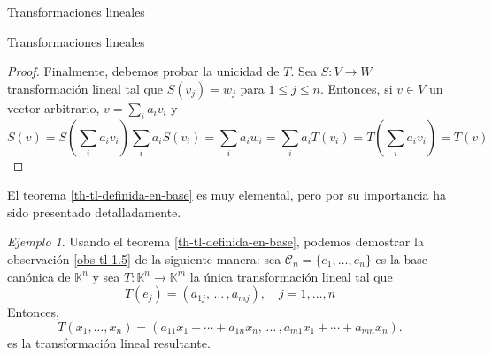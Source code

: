 \documentclass[a4paper,12pt,twoside,spanish,reqno]{amsbook}
\numberwithin{equation}{section}
\theoremstyle{definition}
\theoremstyle{remark}
\newtheorem*{ejemplo*}{Ejemplo}
\newcommand{\K}{\mathbb K}
\begin{document}
\begin{chapter}{Transformaciones lineales}
\begin{section}{Transformaciones lineales}
\begin{proof}
                Finalmente,  debemos probar la unicidad de $T$. Sea $S: V \to W$ transformación lineal tal que $S(v_j) = w_j$ para $1 \le j \le n$. Entonces,  si $v \in V$ un vector arbitrario, $v = \sum_i a_i v_i$ y
                \begin{equation*}
                    S(v) = S(\sum_i a_i v_i)\sum_i a_i S( v_i) = \sum_i a_iw_i = 
                     \sum_i a_i T( v_i) =  T(\sum_i a_i v_i) = T(v)
                \end{equation*}
            \end{proof}
        
        El teorema \ref{th-tl-definida-en-base} es muy elemental, pero por su importancia ha sido presentado
        detalladamente. 
        
            \begin{ejemplo*} Usando el teorema \ref{th-tl-definida-en-base}, podemos demostrar la observación \ref{obs-tl-1.5} de la siguiente manera: sea  $\mathcal C_n = \{e_1,\ldots,e_n\}$ es la base canónica de $\K^n$ y  sea  $T: \K^n \to \K^m$ la única transformación lineal tal que 
            \begin{equation*}
            T(e_j)  = (a_{1j},\, \ldots\,,a_{mj} ), \quad j=1,\ldots,n
            \end{equation*}	
            Entonces, 
            \begin{equation*}
            T(x_1,\ldots,x_n) = (a_{11}x_1+\cdots + a_{1n}x_n,\, \ldots\,,a_{m1}x_1+\cdots + a_{mn}x_n ).
            \end{equation*}
            es la transformación lineal resultante.
        \end{ejemplo*}
        

\end{section}
\end{chapter}
\end{document}
